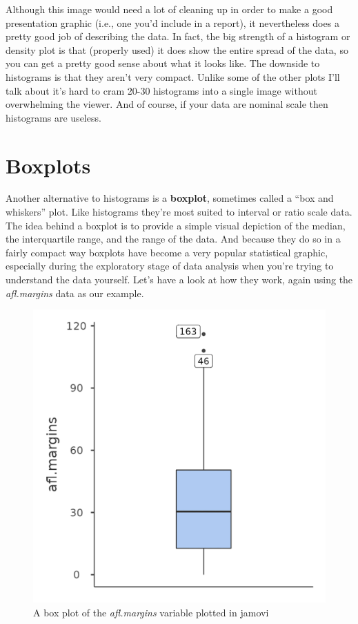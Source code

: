 \documentclass[
  a4paper,
]{book}
\begin{document}
Although this image would need a lot of cleaning up in order to make a
good presentation graphic (i.e., one you'd include in a report), it
nevertheless does a pretty good job of describing the data. In fact, the
big strength of a histogram or density plot is that (properly used) it
does show the entire spread of the data, so you can get a pretty good
sense about what it looks like. The downside to histograms is that they
aren't very compact. Unlike some of the other plots I'll talk about it's
hard to cram 20-30 histograms into a single image without overwhelming
the viewer. And of course, if your data are nominal scale then
histograms are useless.

\hypertarget{boxplots}{%
\section{Boxplots}\label{boxplots}}

Another alternative to histograms is a \textbf{boxplot}, sometimes
called a ``box and whiskers'' plot. Like histograms they're most suited
to interval or ratio scale data. The idea behind a boxplot is to provide
a simple visual depiction of the median, the interquartile range, and
the range of the data. And because they do so in a fairly compact way
boxplots have become a very popular statistical graphic, especially
during the exploratory stage of data analysis when you're trying to
understand the data yourself. Let's have a look at how they work, again
using the \emph{afl.margins} data as our example.

\begin{figure}

\includegraphics[width=1\textwidth,height=\textheight]{images/fig5-4.png} \hfill{}

\caption{\label{fig-fig5-4}A box plot of the \emph{afl.margins} variable
plotted in jamovi}

\end{figure}
\end{document}
